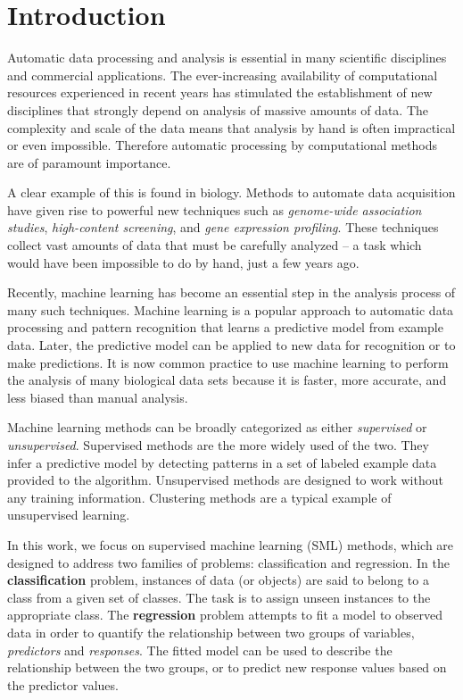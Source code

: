\chapter{Introduction}

Automatic data processing and analysis is essential in many scientific disciplines and commercial
applications. The ever-increasing availability of computational resources experienced in recent
years has stimulated the establishment of new disciplines that strongly depend on analysis of massive
amounts of data. The complexity and scale of the data means that analysis by hand is often
impractical or even impossible. Therefore automatic processing by computational methods are of
paramount importance.

A clear example of this is found in biology. Methods to automate data acquisition have given rise to
powerful new techniques such as \emph{genome-wide association studies}, \emph{high-content
screening}, and \emph{gene expression profiling}. These techniques collect vast amounts of data that
must be carefully analyzed -- a task which would have been impossible to do by hand, just a few
years ago.

Recently, machine learning has become an essential step in the analysis process of many such
techniques.  Machine learning is a popular approach to automatic data processing and pattern
recognition that learns a predictive model from example data. Later, the predictive model can be
applied to new data for recognition or to make predictions. It is now common practice to use machine
learning to perform the analysis of many biological data sets because it is faster, more accurate,
and less biased than manual analysis.

Machine learning methods can be broadly categorized as either \emph{supervised} or
\emph{unsupervised}. Supervised methods are the more widely used of the two. They infer a predictive
model by detecting patterns in a set of labeled example data provided to the algorithm. Unsupervised
methods are designed to work without any training information. Clustering methods are a typical
example of unsupervised learning. 

In this work, we focus on supervised machine learning (SML) methods, which are designed to address
two families of problems: classification and regression. In the {\bf classification} problem,
instances of data (or objects) are said to belong to a class from a given set of classes. The task
is to assign unseen instances to the appropriate class. The {\bf regression} problem attempts to fit
a model to observed data in order to quantify the relationship between two groups of variables,
\emph{predictors} and \emph{responses}. The fitted model can be used to describe the relationship
between the two groups, or to predict new response values based on the predictor values.

